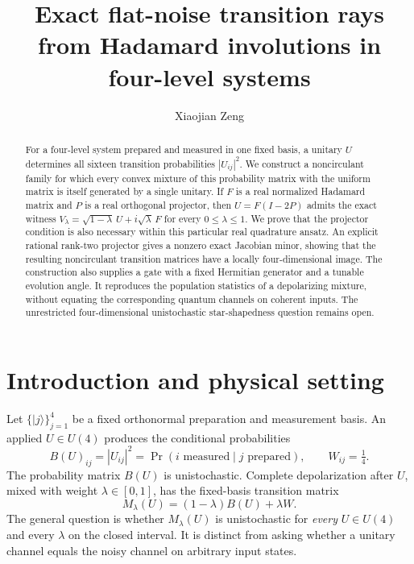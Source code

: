 \documentclass[aip,jmp,preprint]{revtex4-2}
\begin{document}
\title{Exact flat-noise transition rays from Hadamard involutions in four-level systems}
\author{Xiaojian Zeng}

\begin{abstract}
For a four-level system prepared and measured in one fixed basis, a unitary $U$ determines all sixteen transition probabilities $|U_{ij}|^2$. We construct a noncirculant family for which every convex mixture of this probability matrix with the uniform matrix is itself generated by a single unitary. If $F$ is a real normalized Hadamard matrix and $P$ is a real orthogonal projector, then $U=F(I-2P)$ admits the exact witness $V_\lambda=\sqrt{1-\lambda}\,U+i\sqrt{\lambda}\,F$ for every $0\leq\lambda\leq1$. We prove that the projector condition is also necessary within this particular real quadrature ansatz. An explicit rational rank-two projector gives a nonzero exact Jacobian minor, showing that the resulting noncirculant transition matrices have a locally four-dimensional image. The construction also supplies a gate with a fixed Hermitian generator and a tunable evolution angle. It reproduces the population statistics of a depolarizing mixture, without equating the corresponding quantum channels on coherent inputs. The unrestricted four-dimensional unistochastic star-shapedness question remains open.
\end{abstract}

\maketitle

\section{Introduction and physical setting}

Let $\{|j\rangle\}_{j=1}^4$ be a fixed orthonormal preparation and measurement basis. An applied $U\in U(4)$ produces the conditional probabilities
\begin{equation}
 B(U)_{ij}=|U_{ij}|^2=\Pr(i\text{ measured}\mid j\text{ prepared}),
 \qquad W_{ij}=\tfrac14 .
 \label{eq:transition}
\end{equation}
The probability matrix $B(U)$ is unistochastic. Complete depolarization after $U$, mixed with weight $\lambda\in[0,1]$, has the fixed-basis transition matrix
\begin{equation}
 M_\lambda(U)=(1-\lambda)B(U)+\lambda W .
 \label{eq:ray}
\end{equation}
The general question is whether $M_\lambda(U)$ is unistochastic for \emph{every} $U\in U(4)$ and every $\lambda$ on the closed interval. It is distinct from asking whether a unitary channel equals the noisy channel on arbitrary input states.
\end{document}

